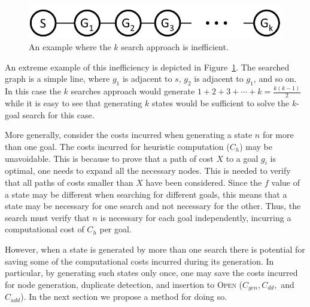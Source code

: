 \documentclass{aicom2e}
\newcommand{\kgs}{$k$-goal search}
\newcommand{\open}{\textsc{Open}}
\begin{document}
\begin{figure}
	\includegraphics[width=\columnwidth]{k-search-bad_cropped}
	\caption{An example where the $k$ search approach is inefficient.}
	\label{fig:k-search-bad}
\end{figure}
An extreme example of this inefficiency is depicted in Figure~\ref{fig:k-search-bad}. The searched graph is a simple line, 
where $g_1$ is adjacent to $s$, $g_2$ is adjacent to $g_1$, and so on. In this case the $k$ searches approach would generate
$1+2+3+\cdots+k=\frac{k(k-1)}{2}$ while it is easy to see that generating $k$ states would be sufficient to solve the \kgs{} for this case. 


More generally, consider the costs incurred when generating a state $n$ for more than one goal. 
The costs incurred for heuristic computation ($C_{h}$) may be unavoidable. This is because to prove that a path of cost $X$ to a goal $g_i$ is optimal, one needs to expand all the necessary nodes. 
This is needed to verify that all paths of costs smaller than $X$ have been considered. Since the $f$ value of a state may be different when searching for different goals, this means that a state may be necessary for one search and not necessary for the other. Thus, the search must verify that $n$ is necessary for each goal independently, incurring a computational cost of $C_{h}$ per goal. 

However, when a state is generated by more than one search there is potential for saving some of the computational costs incurred during its generation. In particular, by generating such states only once, one may save the costs incurred for node generation, duplicate detection, and insertion to \open{} ($C_{gen}, C_{dd},$ and $C_{add}$). In the next section we propose a method for doing so. 
\end{document}
